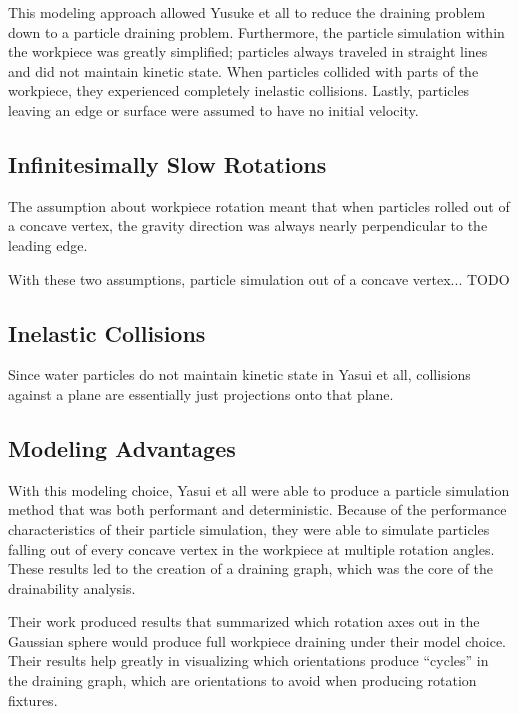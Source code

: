 This modeling approach allowed Yusuke et all to reduce the draining problem down to a particle draining problem. Furthermore, the particle simulation within the workpiece was greatly simplified; particles always traveled in straight lines and did not maintain kinetic state. When particles collided with parts of the workpiece, they experienced completely inelastic collisions. Lastly, particles leaving an edge or surface were assumed to have no initial velocity.

	\subsection{Infinitesimally Slow Rotations}

The assumption about workpiece rotation meant that when particles rolled out of a concave vertex, the gravity direction was always nearly perpendicular to the leading edge.


With these two assumptions, particle simulation out of a concave vertex... TODO

	\subsection{Inelastic Collisions}

Since water particles do not maintain kinetic state in Yasui et all, collisions against a plane are essentially just projections onto that plane.


	\subsection{Modeling Advantages}

With this modeling choice, Yasui et all were able to produce a particle simulation method that was both performant and deterministic. Because of the performance characteristics of their particle simulation, they were able to simulate particles falling out of every concave vertex in the workpiece at multiple rotation angles. These results led to the creation of a draining graph, which was the core of the drainability analysis.

Their work produced results that summarized which rotation axes out in the Gaussian sphere would produce full workpiece draining under their model choice. Their results help greatly in visualizing which orientations produce ``cycles'' in the draining graph, which are orientations to avoid when producing rotation fixtures.

